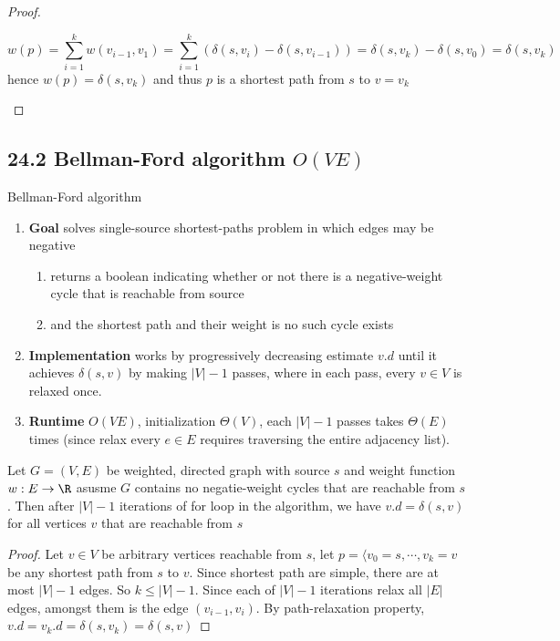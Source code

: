 \documentclass[11pt]{article}
\begin{document}
\begin{proposition*}
\begin{enumerate}
\begin{proof}
\begin{enumerate}
                \[
                    w(p) = \sum_{i=1}^k w(v_{i-1}, v_1) = \sum_{i=1}^k (\delta(s, v_i) - \delta(s, v_{i-1})) = \delta(s,v_k) - \delta(s, v_0) = \delta(s, v_k)
                \]               
                hence $w(p) = \delta(s,v_k)$ and thus $p$ is a shortest path from $s$ to $v=v_k$
            \end{enumerate}
        \end{proof}
    \end{enumerate}
\end{proposition*}



\subsection*{24.2 Bellman-Ford algorithm $O(VE)$}


\begin{defn*}
    Bellman-Ford algorithm
    \begin{enumerate}
        \item \textbf{Goal} solves single-source shortest-paths problem in which edges may be negative 
        \begin{enumerate}
            \item returns a boolean indicating whether or not there is a negative-weight cycle that is reachable from source 
        \item and the shortest path and their weight is no such cycle exists 
        \end{enumerate}
        \item \textbf{Implementation} works by progressively decreasing estimate $v.d$ until it achieves $\delta(s,v)$ by making $|V| - 1$ passes, where in each pass, every $v\in V$ is relaxed once. 
        \item \textbf{Runtime} $O(VE)$, initialization $\Theta(V)$, each $|V| - 1$ passes takes $\Theta(E)$ times (since relax every $e\in E$ requires traversing the entire adjacency list).
    \end{enumerate}
\end{defn*}


\begin{lemma*}
    Let $G = (V,E)$ be weighted, directed graph with source $s$ and weight function $w:E\to\R$ asusme $G$ contains no negatie-weight cycles that are reachable from $s$. Then after $|V| - 1$ iterations of for loop in the algorithm, we have $v.d = \delta(s,v)$ for all vertices $v$ that are reachable from $s$
    \begin{proof}
        Let $v\in V$ be arbitrary vertices reachable from $s$, let $p = \langle v_0 = s,\cdots, v_k = v$ be any shortest path from $s$ to $v$. Since shortest path are simple, there are at most $|V| - 1$ edges. So $k \leq |V| - 1$. Since each of $|V| - 1$ iterations relax all $|E|$ edges, amongst them is the edge $(v_{i-1}, v_i)$. By path-relaxation property, $v.d = v_k.d = \delta(s,v_k) = \delta(s,v)$
    \end{proof}
\end{lemma*}
\end{document}
